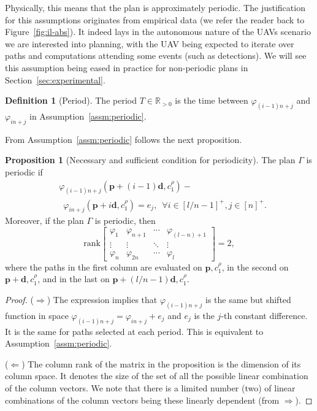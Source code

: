 \documentclass[letterpaper,10pt,conference]{ieeeconf}
\theoremstyle{definition}
\newtheorem{prop}[thm]{Proposition}
\newtheorem{defn}{Definition}[section]
\begin{document}
Physically, this means that the plan is approximately periodic. The justification for this assumptions originates from empirical data (we refer the reader back to Figure~\ref{fig:il-abs}). It indeed lays in the autonomous nature of the UAVs scenario we are interested into planning, with the UAV being expected to iterate over paths and computations attending some events (such as detections). We will see this assumption being eased in practice for non-periodic plans in Section~\ref{sec:experimental}.

\begin{defn}[Period]\label{def:period}
  The period $T\in\mathbb{R}_{> 0}$ is the time between $\varphi_{(i-1)n+j}$ and $\varphi_{in+j}$ in Assumption~\ref{assm:periodic}.
\end{defn} 

From Assumption~\ref{assm:periodic} follows the next proposition.

\begin{prop}[Necessary and sufficient condition for periodicity]\label{prop:rank}
  The plan $\Gamma$ is periodic if
  \begin{equation*}\begin{split}
    &\varphi_{(i-1)n+j}(\mathbf{p}+(i-1)\mathbf{d},c_1^\rho)-\\ &\,\,\,\varphi_{in+j}(\mathbf{p}+i\mathbf{d},c_1^\rho)=e_j,\,\,\,\forall i\in[l/n-1]^+,j\in[n]^+.
  \end{split}\end{equation*}
  Moreover, if the plan $\Gamma$ is periodic, then
  \begin{equation*}
    \mathrm{rank}\begin{bmatrix}
        \varphi_1 & \varphi_{n+1} & \cdots & \varphi_{(l-n)+1} \\ 
        \vdots & \vdots & \ddots & \vdots \\
        \varphi_n & \varphi_{2n} & \cdots & \varphi_l   
      \end{bmatrix}=2,
  \end{equation*}
  where the paths in the first column are evaluated on $\mathbf{p},c_1^\rho$, in the second on $\mathbf{p}+\mathbf{d},c_1^\rho$, and in the last on $\mathbf{p}+(l/n-1)\mathbf{d},c_1^\rho$.
\end{prop}
\begin{proof}($\Longrightarrow$) The expression implies that $\varphi_{(i-1)n+j}$ is the same but shifted function in space $\varphi_{(i-1)n+j}=\varphi_{in+j}+e_j$ and $e_j$ is the $j$-th constant difference. It is the same for paths selected at each period. This is equivalent to Assumption~\ref{assm:periodic}.
  
($\Longleftarrow$) The column rank of the matrix in the proposition is the dimension of its column space. It denotes the size of the set of all the possible linear combination of the column vectors. We note that there is a limited number (two) of linear combinations of the column vectors being these linearly dependent (from $\Longrightarrow$). 
\end{proof}
\end{document}
